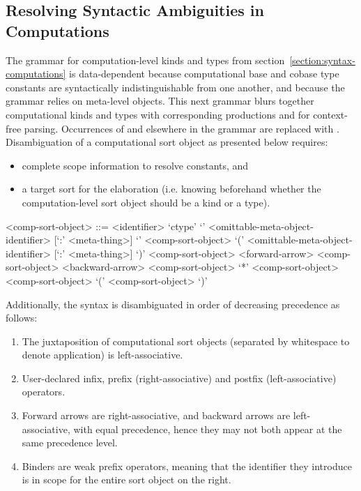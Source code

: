 \subsection{Resolving Syntactic Ambiguities in Computations}

The grammar for computation-level kinds and types from section~\ref{section:syntax-computations} is data-dependent because computational base and cobase type constants are syntactically indistinguishable from one another, and because the grammar relies on meta-level objects.
This next grammar blurs together computational kinds and types with corresponding productions  and  for context-free parsing.
Occurrences of  and  elsewhere in the grammar are replaced with .
Disambiguation of a computational sort object as presented below requires:
\begin{itemize}
\item complete scope information to resolve constants, and
\item a target sort for the elaboration (i.e. knowing beforehand whether the computation-level sort object should be a kind or a type).
\end{itemize}

\begin{grammar}
<comp-sort-object> ::= <identifier>
\alt `ctype'
\alt `{' <omittable-meta-object-identifier> [`:' <meta-thing>] `}' <comp-sort-object>
\alt `(' <omittable-meta-object-identifier> [`:' <meta-thing>] `)' <comp-sort-object>
 <forward-arrow> <comp-sort-object>
 <backward-arrow> <comp-sort-object>
 `*' <comp-sort-object>
 <comp-sort-object>
\alt `(' <comp-sort-object> `)'
\end{grammar}

Additionally, the syntax is disambiguated in order of decreasing precedence as follows:

\begin{enumerate}
\item The juxtaposition of computational sort objects (separated by whitespace to denote application) is left-associative.
\item User-declared infix, prefix (right-associative) and postfix (left-associative) operators.
\item Forward arrows are right-associative, and backward arrows are left-associative, with equal precedence, hence they may not both appear at the same precedence level.
\item Binders are weak prefix operators, meaning that the identifier they introduce is in scope for the entire sort object on the right.
\end{enumerate}
